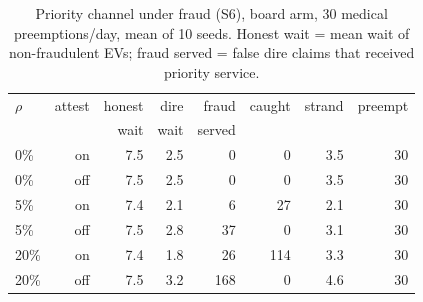 \begin{table}
\centering
\caption{Priority channel under fraud (S6), board arm, 30 medical
preemptions/day, mean of 10 seeds.  Honest wait = mean wait of
non-fraudulent EVs; fraud served = false dire claims that received
priority service.}
\label{tab:e5}
\begin{tabular}{@{}lr rrrrrr@{}}
\toprule
$\rho$ & attest & honest & dire & fraud & caught & strand & preempt \\
 & & wait & wait & served & & & \\
\midrule
0\% & on & 7.5 & 2.5 & 0 & 0 & 3.5 & 30 \\
0\% & off & 7.5 & 2.5 & 0 & 0 & 3.5 & 30 \\
5\% & on & 7.4 & 2.1 & 6 & 27 & 2.1 & 30 \\
5\% & off & 7.5 & 2.8 & 37 & 0 & 3.1 & 30 \\
20\% & on & 7.4 & 1.8 & 26 & 114 & 3.3 & 30 \\
20\% & off & 7.5 & 3.2 & 168 & 0 & 4.6 & 30 \\
\bottomrule
\end{tabular}
\end{table}
